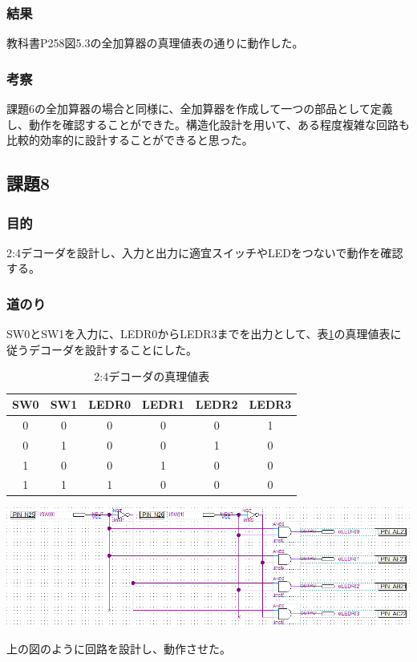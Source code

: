\documentclass[a4paper]{jarticle}
\begin{document}
\subsubsection{結果}
教科書P258図5.3の全加算器の真理値表の通りに動作した。
\subsubsection{考察}
課題6の全加算器の場合と同様に、全加算器を作成して一つの部品として定義し、動作を確認することができた。構造化設計を用いて、ある程度複雑な回路も比較的効率的に設計することができると思った。
\subsection{課題8}
\subsubsection{目的}
2:4デコーダを設計し、入力と出力に適宜スイッチやLEDをつないで動作を確認する。
\subsubsection{道のり}
SW0とSW1を入力に、LEDR0からLEDR3までを出力として、表\ref{Report8decoder}の真理値表に従うデコーダを設計することにした。
\begin{table}[ht]
	\begin{center}
		\caption{2:4デコーダの真理値表}
		\label{Report8decoder}
		\begin{tabular}{|c|c|c|c|c|c|}					\hline
			SW0	&SW1	&LEDR0	&LEDR1	&LEDR2	&LEDR3\\	\hline\hline
			0	&0	&0	&0	&0	&1\\		\hline
			0	&1	&0	&0	&1	&0\\		\hline
			1	&0	&0	&1	&0	&0\\		\hline
			1	&1	&1	&0	&0	&0\\		\hline
		\end{tabular}
	\end{center}
\end{table}
\begin{center}
	\includegraphics[width=15cm]{work8.PNG}
\end{center}
上の図のように回路を設計し、動作させた。
\end{document}
